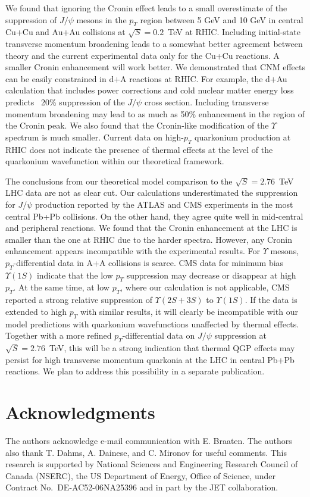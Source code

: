 \documentclass[article,showpacs,preprintnumbers,amsmath,amssymb]{revtex4}
\begin{document}
We found that ignoring the Cronin effect leads to a small overestimate 
of the suppression of $J/\psi$ mesons in the $p_T$ region between 5 GeV and 
10 GeV in central Cu+Cu and Au+Au collisions 
at $\sqrt{S}=0.2$~TeV at RHIC. Including initial-state transverse momentum 
broadening  leads to a somewhat better agreement between theory and the current 
experimental data only for the Cu+Cu reactions. A smaller Cronin enhancement 
will work better. We demonstrated that CNM
effects can be easily constrained in d$+$A reactions at RHIC. For example, 
the d$+$Au calculation that includes power corrections and cold nuclear matter
energy loss predicts ~20\% suppression of the $J/\psi$ cross section. 
Including transverse momentum broadening may lead to as much as 50\% 
enhancement in the region of the Cronin peak. We also found  that 
the Cronin-like modification of the $\Upsilon$ spectrum is much smaller.        
Current data on high-$p_T$ quarkonium production at RHIC does not indicate 
the presence of thermal effects at the level of the quarkonium wavefunction
within our theoretical framework. 


The conclusions from our theoretical model comparison to the $\sqrt{S}=2.76$~TeV 
LHC data are not as clear cut. Our calculations underestimated the 
suppression for $J/\psi$ production reported by the ATLAS and CMS experiments 
in the most central Pb+Pb collisions. On the other hand, they agree quite well in 
mid-central and peripheral reactions. We found that the Cronin enhancement at the
LHC is smaller than the one at RHIC due to the harder spectra. However, any Cronin 
enhancement appears incompatible with the experimental results.  
For $\Upsilon$ mesons, $p_T$-differential data in A+A collisions is scarce. 
CMS data for minimum bias $\Upsilon(1S)$ indicate that the low $p_T$ 
suppression may decrease or disappear at high $p_T$. At the same time, at low $p_T$,
where our calculation is not applicable, CMS reported a strong relative 
suppression of $\Upsilon(2S+3S)$ to $\Upsilon(1S)$. If the data is extended 
to high $p_T$ with similar results, it will clearly be incompatible with
our model predictions with quarkonium wavefunctions unaffected by thermal effects.
Together with a more refined $p_T$-differential data on $J/\psi$ suppression at
$\sqrt{S}=2.76$~TeV, this will be a strong indication that thermal QGP effects
may persist for high transverse momentum quarkonia at the LHC in central Pb+Pb
reactions. We plan to address this  possibility in a separate publication.

\section{Acknowledgments}
The authors acknowledge e-mail communication with E. Braaten. The authors also
thank  T. Dahms, A. Dainese, and C. Mironov for useful comments.  This research is
supported by  National Sciences and Engineering Research Council of Canada
(NSERC),  the US Department of Energy, Office of Science, under Contract
No.~DE-AC52-06NA25396 and in part by the JET collaboration.
\end{document}
